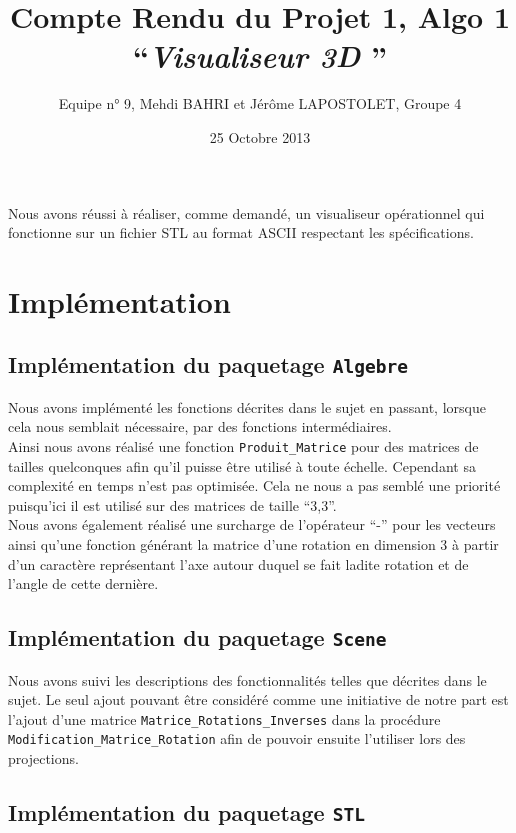 \documentclass[10pt]{article}
\title{Compte Rendu du Projet 1, Algo 1\\
``{\em Visualiseur 3D }'' }
\author{Equipe n° 9, Mehdi BAHRI et Jérôme LAPOSTOLET, Groupe 4}
\date{25 Octobre 2013}
\begin{document}
\maketitle

Nous avons réussi à réaliser, comme demandé, un visualiseur opérationnel qui fonctionne sur un fichier STL au format ASCII respectant les spécifications.

\section{Implémentation}

\subsection{Implémentation du paquetage \lstinline!Algebre!}

Nous avons implémenté les fonctions décrites dans le sujet en passant, lorsque cela nous semblait nécessaire, par des fonctions intermédiaires.\\
Ainsi nous avons réalisé une fonction \lstinline!Produit_Matrice! pour des matrices de tailles quelconques afin qu'il puisse être utilisé à toute échelle. Cependant sa complexité en temps n'est pas optimisée. Cela ne nous a pas semblé une priorité puisqu'ici il est utilisé sur des matrices de taille ``3,3''.\\
Nous avons également réalisé une surcharge de l'opérateur ``-'' pour les vecteurs ainsi qu'une fonction générant la matrice d'une rotation en dimension 3 à partir d'un caractère représentant l'axe autour duquel se fait ladite rotation et de l'angle de cette dernière.

\subsection{Implémentation du paquetage \lstinline!Scene!}

Nous avons suivi les descriptions des fonctionnalités telles que décrites dans le sujet. Le seul ajout pouvant être considéré comme une initiative de notre part est l'ajout d'une matrice \lstinline!Matrice_Rotations_Inverses! dans la procédure \lstinline!Modification_Matrice_Rotation! afin de pouvoir ensuite l'utiliser lors des projections.

\subsection{Implémentation du paquetage \lstinline!STL!}
\end{document}
